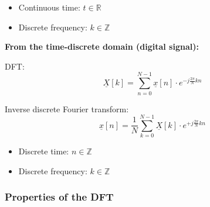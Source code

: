 \begin{refsection}
\begin{minipage}{0.45\linewidth}
	\begin{itemize}
		\item Continuous time: $t \in \mathbb{R}$
		\item Discrete frequency: $k \in \mathbb{Z}$
	\end{itemize}
\end{minipage}
\hfill
\begin{minipage}{0.45\linewidth}
	\textbf{From the time-discrete domain (digital signal):}
	
	\vspace{0.5em}
	
	\acf{DFT}:
	\begin{equation*}
		\underline{X}[k] = \sum\limits_{n = 0}^{N - 1} \underline{x}[n] \cdot e^{- j \frac{2 \pi}{N} k n}
	\end{equation*}
	
	Inverse discrete Fourier transform:
	\begin{equation*}
		\underline{x}[n] = \frac{1}{N} \sum\limits_{k = 0}^{N - 1} \underline{X}[k]  \cdot e^{+ j \frac{2 \pi}{N} k n}
	\end{equation*}
	
	\begin{itemize}
		\item Discrete time: $n \in \mathbb{Z}$
		\item Discrete frequency: $k \in \mathbb{Z}$
	\end{itemize}
\end{minipage}

\subsubsection{Properties of the \acs{DFT}}


\end{refsection}
